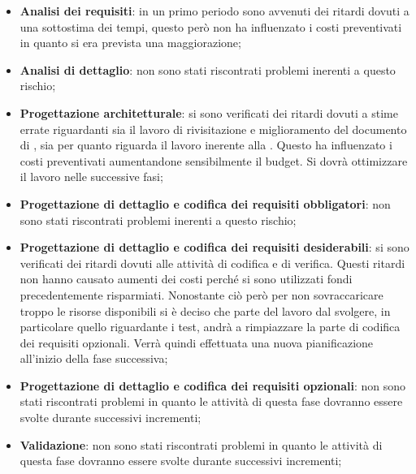 			\begin{itemize}
				\item \textbf{Analisi dei requisiti}: in un primo periodo sono avvenuti dei ritardi dovuti a una sottostima dei tempi, questo però non ha influenzato i costi preventivati in quanto si era prevista una maggiorazione;
				\item \textbf{Analisi di dettaglio}: non sono stati riscontrati problemi inerenti a questo rischio;
				\item \textbf{Progettazione architetturale}: si sono verificati dei ritardi dovuti a stime errate riguardanti sia il lavoro di rivisitazione e miglioramento del documento di \docNameVersionAdR, sia per quanto riguarda il lavoro inerente alla \docNameVersionST. Questo ha influenzato i costi preventivati aumentandone sensibilmente il budget. Si dovrà ottimizzare il lavoro nelle successive fasi;
				\item \textbf{Progettazione di dettaglio e codifica dei requisiti obbligatori}: non sono stati riscontrati problemi inerenti a questo rischio;
				\item \textbf{Progettazione di dettaglio e codifica dei requisiti desiderabili}: si sono verificati dei ritardi dovuti alle attività di codifica e di verifica. Questi ritardi non hanno causato aumenti dei costi perché si sono utilizzati fondi precedentemente risparmiati. Nonostante ciò però per non sovraccaricare troppo le risorse disponibili si è deciso che parte del lavoro dal svolgere, in particolare quello riguardante i test, andrà a rimpiazzare la parte di codifica dei requisiti opzionali. Verrà quindi effettuata una nuova pianificazione all'inizio della fase successiva;
				\item \textbf{Progettazione di dettaglio e codifica dei requisiti opzionali}: non sono stati riscontrati problemi in quanto le attività di questa fase dovranno essere svolte durante successivi incrementi;
				\item \textbf{Validazione}: non sono stati riscontrati problemi in quanto le attività di questa fase dovranno essere svolte durante successivi incrementi;
			\end{itemize}



